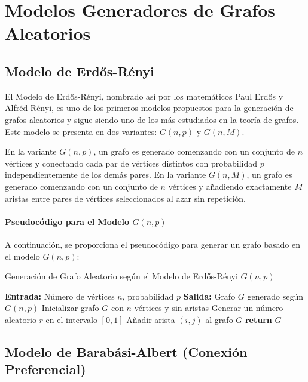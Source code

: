 \documentclass[12pt]{book}
\begin{document}
\section{Modelos Generadores de Grafos Aleatorios}

\subsection{Modelo de Erdős-Rényi}

El Modelo de Erdős-Rényi, nombrado así por los matemáticos Paul Erdős y Alfréd Rényi, es uno de los primeros modelos propuestos para la generación de grafos aleatorios y sigue siendo uno de los más estudiados en la teoría de grafos. Este modelo se presenta en dos variantes: $G(n, p)$ y $G(n, M)$.

En la variante $G(n, p)$, un grafo es generado comenzando con un conjunto de $n$ vértices y conectando cada par de vértices distintos con probabilidad $p$ independientemente de los demás pares. En la variante $G(n, M)$, un grafo es generado comenzando con un conjunto de $n$ vértices y añadiendo exactamente $M$ aristas entre pares de vértices seleccionados al azar sin repetición.

\paragraph{Pseudocódigo para el Modelo $G(n, p)$}

A continuación, se proporciona el pseudocódigo para generar un grafo basado en el modelo $G(n, p)$:

\begin{algorithm}
\caption{Generación de Grafo Aleatorio según el Modelo de Erdős-Rényi $G(n, p)$}
\begin{algorithmic}[1]
\State \textbf{Entrada:} Número de vértices $n$, probabilidad $p$
\State \textbf{Salida:} Grafo $G$ generado según $G(n, p)$
    \State Inicializar grafo $G$ con $n$ vértices y sin aristas
        \State Generar un número aleatorio $r$ en el intervalo $[0, 1]$
            \State Añadir arista $(i, j)$ al grafo $G$
        \EndIf
    \EndFor
    \State \textbf{return} $G$
\EndProcedure
\end{algorithmic}
\end{algorithm}


\subsection{Modelo de Barabási-Albert (Conexión Preferencial)}
\end{document}
